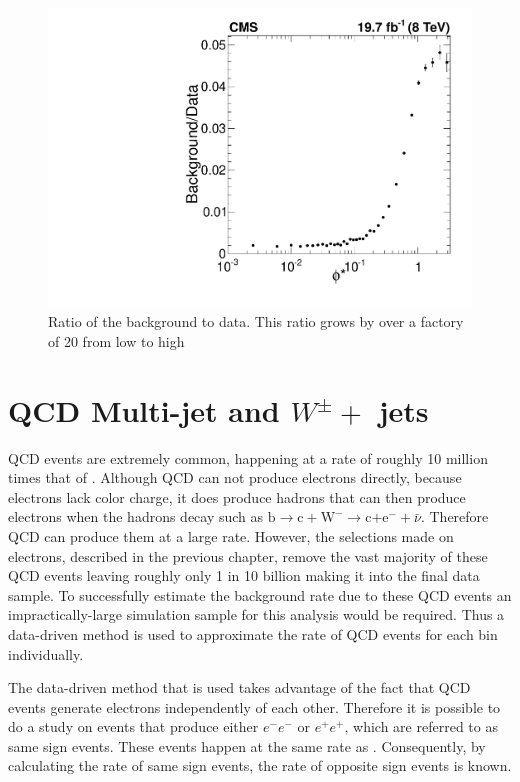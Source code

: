 \begin{figure}
    \centering
    \includegraphics[width=\textwidth]{figures/DataSets/BGRatioMADGRAPHphistar.pdf}
    \caption[Background to data ratio]{Ratio of the background to data. This ratio grows by over a factory of 20 from  low to high \phistar  }
    \label{fig:PhistarDataVsBackground}
\end{figure}
\section{QCD Multi-jet and \texorpdfstring{$W^\pm+$}{W} jets}
QCD events are extremely common, happening at a rate of roughly 10 million times that of \Ztoee. Although QCD can not produce electrons directly, because electrons lack color charge, it does produce hadrons that can then produce electrons when the hadrons decay such as $\text{b}\rightarrow \text{c}+\text{W}^{-} \rightarrow \text{c+e}^{-}+\bar{\nu}$. Therefore QCD can produce them at a large rate. However, the selections made on electrons, described in the previous chapter, remove the vast majority of these QCD events leaving roughly only 1 in  10 billion making it into the final data sample. To successfully estimate the background rate due to these QCD events an impractically-large simulation sample for this analysis would be required. Thus a data-driven method is used to approximate the rate of QCD events for each \phistar bin individually.  

The data-driven method that is used takes advantage of the fact that QCD events generate electrons independently of each other. Therefore it is possible to do a study on events that produce either $e^-e^-$ or $e^+e^+$, which are referred to as same sign events. These events happen at the same rate as . Consequently, by calculating the rate of  same sign events, the rate of opposite sign events is known. 


